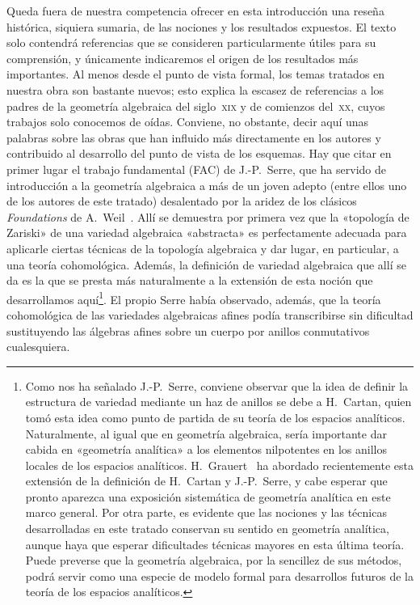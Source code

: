 Queda fuera de nuestra competencia ofrecer en esta introducción una reseña histórica, siquiera sumaria, de las nociones y los resultados expuestos.
El texto solo contendrá referencias que se consideren particularmente útiles para su comprensión, y únicamente indicaremos el origen de los resultados más importantes.
Al menos desde el punto de vista formal, los temas tratados en nuestra obra son bastante nuevos; esto explica la escasez de referencias a los padres de la geometría algebraica del siglo~\textsc{xix} y de comienzos del~\textsc{xx}, cuyos trabajos solo conocemos de oídas.
Conviene, no obstante, decir aquí unas palabras sobre las obras que han influido más directamente en los autores y contribuido al desarrollo del punto de vista de los esquemas.
Hay que citar en primer lugar el trabajo fundamental (FAC) de J.-P.~Serre, que ha servido de introducción a la geometría algebraica a más de un joven adepto (entre ellos uno de los autores de este tratado) desalentado por la aridez de los clásicos \emph{Foundations} de A.~Weil~\cite{I-18}.
Allí se demuestra por primera vez que la «topología de Zariski» de una variedad algebraica «abstracta» es perfectamente adecuada para aplicarle ciertas técnicas de la topología algebraica y dar lugar, en particular, a una teoría cohomológica.
Además, la definición de variedad algebraica que allí se da es la que se presta más naturalmente a la extensión de esta noción que desarrollamos aquí\footnote{Como nos ha señalado J.-P.~Serre, conviene observar que la idea de definir la estructura de variedad mediante un haz de anillos se debe a H.~Cartan, quien tomó esta idea como punto de partida de su teoría de los espacios analíticos.
Naturalmente, al igual que en geometría algebraica, sería importante dar cabida en «geometría analítica» a los elementos nilpotentes en los anillos locales de los espacios analíticos.
H.~Grauert~\cite{I-5} ha abordado recientemente esta extensión de la definición de H.~Cartan y J.-P.~Serre, y cabe esperar que pronto aparezca una exposición sistemática de geometría analítica en este marco general.
Por otra parte, es evidente que las nociones y las técnicas desarrolladas en este tratado conservan su sentido en geometría analítica, aunque haya que esperar dificultades técnicas mayores en esta última teoría.
Puede preverse que la geometría algebraica, por la sencillez de sus métodos, podrá servir como una especie de modelo formal para desarrollos futuros de la teoría de los espacios analíticos.}.
El propio Serre había observado, además, que la teoría cohomológica de las variedades algebraicas afines podía transcribirse sin dificultad sustituyendo las álgebras afines sobre un cuerpo por anillos conmutativos cualesquiera.
